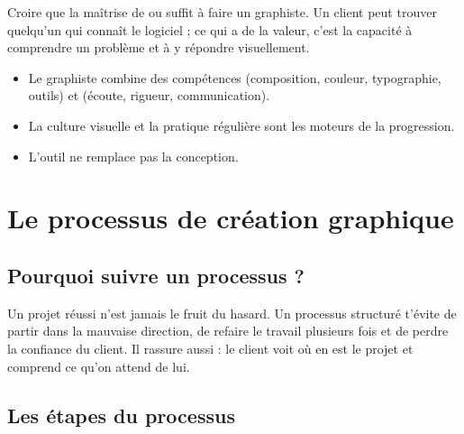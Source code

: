 \begin{erreur}
Croire que la maîtrise de  ou  suffit à faire un graphiste. Un client peut trouver quelqu'un qui connaît le logiciel ; ce qui a de la valeur, c'est la capacité à comprendre un problème et à y répondre visuellement.
\end{erreur}

\begin{retenir}
\begin{itemize}
    \item Le graphiste combine des compétences  (composition, couleur, typographie, outils) et  (écoute, rigueur, communication).
    \item La culture visuelle et la pratique régulière sont les moteurs de la progression.
    \item L'outil ne remplace pas la conception.
\end{itemize}
\end{retenir}

\section{Le processus de création graphique}

\subsection{Pourquoi suivre un processus ?}

Un projet réussi n'est jamais le fruit du hasard. Un processus structuré t'évite de partir dans la mauvaise direction, de refaire le travail plusieurs fois et de perdre la confiance du client. Il rassure aussi : le client voit où en est le projet et comprend ce qu'on attend de lui.

\subsection{Les étapes du processus}

